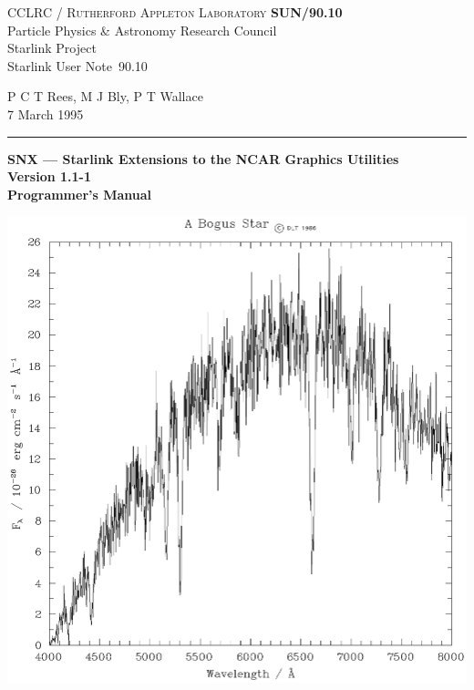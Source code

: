 \documentclass[twoside,11pt]{article}
\newcommand{\stardoccategory}  {Starlink User Note}
\newcommand{\stardocinitials}  {SUN}
\newcommand{\stardocnumber}    {90.10}
\newcommand{\stardocauthors}   {P C T Rees, M J Bly,  P T Wallace}
\newcommand{\stardocdate}      {7 March 1995}
\newcommand{\stardoctitle}     {SNX --- Starlink Extensions to
                                the NCAR Graphics Utilities}
\newcommand{\stardocversion}   {Version 1.1-1}
\newcommand{\stardocmanual}    {Programmer's Manual}
\newcommand{\stardocname}{\stardocinitials /\stardocnumber}
\newenvironment{latexonly}{}{}
\renewcommand{\_}{\texttt{\symbol{95}}}
\begin{document}
\thispagestyle{empty}

\begin{latexonly}
   CCLRC / \textsc{Rutherford Appleton Laboratory} \hfill \textbf{\stardocname}\\
   {\large Particle Physics \& Astronomy Research Council}\\
   {\large Starlink Project\\}
   {\large \stardoccategory\ \stardocnumber}
   \begin{flushright}
   \stardocauthors\\
   \stardocdate
   \end{flushright}
   \vspace{-4mm}
   \rule{\textwidth}{0.5mm}
   \vspace{5mm}
   \begin{center}
   {\Huge\textbf{\stardoctitle \\ [2.5ex]}}
   {\LARGE\textbf{\stardocversion \\ [4ex]}}
   {\Huge\textbf{\stardocmanual}}
   \end{center}
   \vspace{5mm}

   \begin{center}
   \includegraphics[scale=0.7]{sun90-fig-1.eps}
   \end{center}

\end{latexonly}
\end{document}
